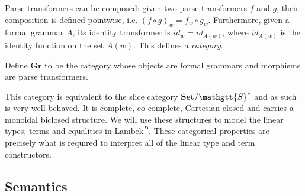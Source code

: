\documentclass[acmsmall,nonacm]{acmart}
\renewcommand{\Sigma}{\mathgtt{S}}
\newcommand{\Set}{\mathbf{Set}}
\newcommand{\Grammar}{\mathbf{Gr}}
\newcommand{\theoryabbv}{$\textrm{Lambek}^D$\xspace}
\begin{document}
{Parse transformers can be composed: given two parse transformers $f$ and $g$,
their composition is defined pointwise, i.e. $(f\circ g)_w = f_w \circ g_w$.
Furthermore, given a formal grammar $A$, its identity transformer is $id_w =
id_{A(w)}$, where $id_{A(w)}$ is the identity function on the set $A(w)$. This
defines a \emph{category}.
\begin{definition}
  Define $\Grammar$ to be the category whose objects are formal
  grammars and morphisms are parse transformers.
\end{definition}
This category is equivalent to the slice category $\Set/\Sigma^*$ and
as such is very well-behaved. It is complete, co-complete, Cartesian
closed and carries a monoidal biclosed structure. We will use these
structures to model the linear types, terms and equalities in
\theoryabbv. These categorical properties are precisely what is
required to interpret all of the linear type and term constructors.

\subsection{Semantics}

}
\end{document}
